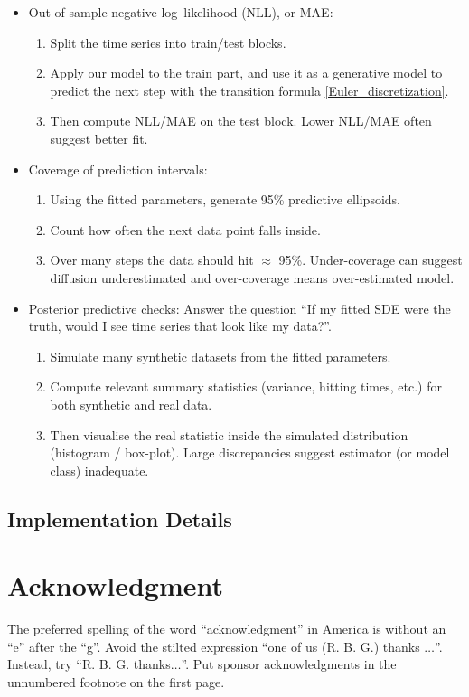 \documentclass[conference]{IEEEtran}
\begin{document}
\begin{itemize}
    \item Out-of-sample negative log–likelihood (NLL), or MAE:
        \begin{enumerate}
            \item Split the time series into train/test blocks.
            \item Apply our model to the train part, and use it as a generative model to predict the next step with the transition formula \eqref{Euler_discretization}.
            \item Then compute NLL/MAE on the test block. Lower NLL/MAE often suggest better fit.
        \end{enumerate}
    \item Coverage of prediction intervals:
        \begin{enumerate}
            \item Using the fitted parameters, generate 95\% predictive ellipsoids.
            \item Count how often the next data point falls inside.
            \item Over many steps the data should hit $\approx$ 95\%. Under-coverage can suggest diffusion underestimated and over-coverage means over-estimated model.
        \end{enumerate}
    \item Posterior predictive checks: Answer the question “If my fitted SDE were the truth, would I see time series that look like my data?”.
        \begin{enumerate}
            \item Simulate many synthetic datasets from the fitted parameters.
            \item Compute relevant summary statistics (variance, hitting times, etc.) for both synthetic and real data.
            \item Then visualise the real statistic inside the simulated distribution (histogram / box-plot). Large discrepancies suggest estimator (or model class) inadequate.
        \end{enumerate}
\end{itemize}

\subsection{Implementation Details}

\section*{Acknowledgment}

The preferred spelling of the word ``acknowledgment'' in America is without 
an ``e'' after the ``g''. Avoid the stilted expression ``one of us (R. B. 
G.) thanks $\ldots$''. Instead, try ``R. B. G. thanks$\ldots$''. Put sponsor 
acknowledgments in the unnumbered footnote on the first page.



\end{document}
